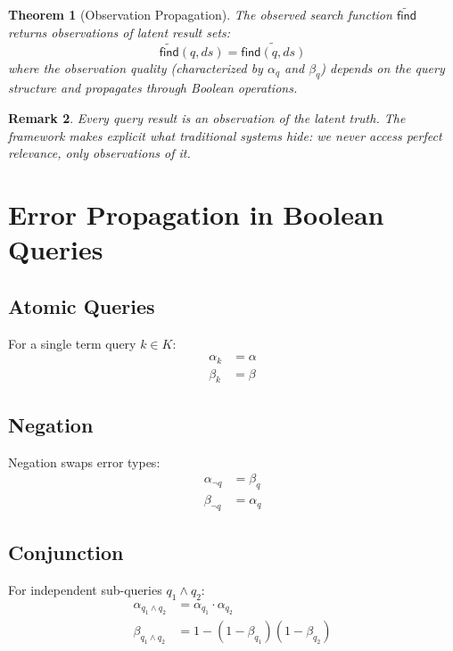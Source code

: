 \documentclass[11pt,final,hidelinks]{article}
\newtheorem{theorem}{Theorem}[section]
\newtheorem{remark}[theorem]{Remark}
\newcommand{\obs}[1]{\widetilde{#1}}  %
\newcommand{\Find}{\mathsf{find}}     %
\newcommand{\OFind}{\obs{\mathsf{find}}}  %
\newcommand{\fprate}{\alpha}
\newcommand{\fnrate}{\beta}
\begin{document}
\begin{theorem}[Observation Propagation]
The observed search function $\OFind$ returns observations of latent result sets:
\begin{equation}
\OFind(q, ds) = \obs{\Find(q, ds)}
\end{equation}
where the observation quality (characterized by $\fprate_q$ and $\fnrate_q$) depends on the query structure and propagates through Boolean operations.
\end{theorem}

\begin{remark}
Every query result is an observation of the latent truth. The framework makes explicit what traditional systems hide: we never access perfect relevance, only observations of it.
\end{remark}

\section{Error Propagation in Boolean Queries}

\subsection{Atomic Queries}

For a single term query $k \in K$:
\begin{align}
\fprate_k &= \fprate \\
\fnrate_k &= \fnrate
\end{align}

\subsection{Negation}

Negation swaps error types:
\begin{align}
\fprate_{\neg q} &= \fnrate_q \\
\fnrate_{\neg q} &= \fprate_q
\end{align}

\subsection{Conjunction}

For independent sub-queries $q_1 \land q_2$:
\begin{align}
\fprate_{q_1 \land q_2} &= \fprate_{q_1} \cdot \fprate_{q_2} \\
\fnrate_{q_1 \land q_2} &= 1 - (1 - \fnrate_{q_1})(1 - \fnrate_{q_2})
\end{align}
\end{document}
